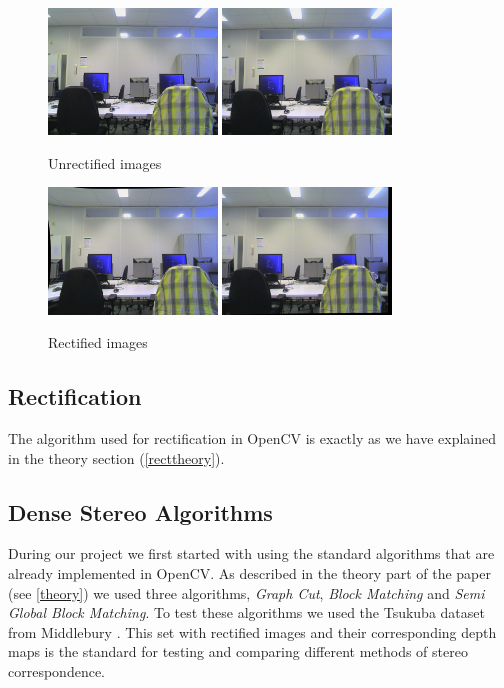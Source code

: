 \documentclass[a4paper]{article}
\begin{document}
\begin{figure}[h] \centering
  \includegraphics[width=0.4\textwidth]{leftown}
  \includegraphics[width=0.4\textwidth]{rightown}
  \caption{Unrectified images}
  \label{unrectified}

  \includegraphics[width=0.4\textwidth]{leftownr}
  \includegraphics[width=0.4\textwidth]{rightownr}
  \caption{Rectified images}
  \label{rectified}
\end{figure} \newpage

\subsection{Rectification}
The algorithm used for rectification in OpenCV is exactly as we have
explained in the theory section (\ref{recttheory}).

\subsection{Dense Stereo Algorithms}
During our project we first started with using the standard algorithms that are
already implemented in OpenCV. As described in the theory
part of the paper (see \ref{theory}) we used three algorithms, \emph{Graph
Cut}, \emph{Block Matching} and \emph{Semi Global Block Matching}.
To test these algorithms we used the Tsukuba dataset from Middlebury
\cite{middlebury}.  This set with rectified images and their corresponding depth
maps is the standard for testing and comparing different methods of
stereo correspondence.
\end{document}
